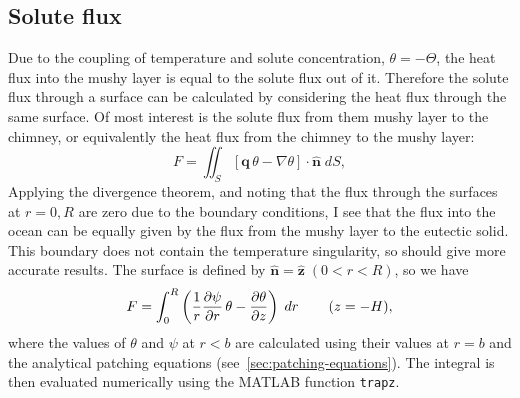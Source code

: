 \documentclass[11pt]{proc}
\begin{document}
\begin{appendices}
  \section{Solute flux} \label{app:solute-flux}
Due to the coupling of temperature and solute concentration, $\theta=-\Theta$, the heat flux into the mushy layer is equal to the solute flux out of it. Therefore the solute flux through a surface can be calculated by considering the heat flux through the same surface. Of most interest is the solute flux from them mushy layer to the chimney, or equivalently the heat flux from the chimney to the mushy layer:
\begin{equation}
F = \iint_S \left[ \mathbf{q} \, \theta - \nabla \theta \right] \cdot \mathbf{\hat{n}} \; dS,
\end{equation}
Applying the divergence theorem, and noting that the flux through the surfaces at $r=0, R$ are zero due to the boundary conditions, I see that the flux into the ocean can be equally given by the flux from the mushy layer to the eutectic solid. This boundary does not contain the temperature singularity, so should give more accurate results. The surface is defined by $\mathbf{\hat{n}} = \mathbf{\hat{z}} \; (0 < r < R) $, so we have
 \begin{equation}
F = \int_{0}^{R} \left( \frac{1}{r} \frac{\partial \psi}{\partial r} \, \theta - \frac{\partial \theta}{\partial z} \right) \; dr \hspace{5ex} (z=-H),
\end{equation}
where the values of $\theta$ and $\psi$ at $r<b$ are calculated using their values at $r=b$ and the analytical patching equations (see~\autoref{sec:patching-equations}). The integral is then evaluated numerically using the MATLAB function \texttt{trapz}.




\end{appendices}
\end{document}
